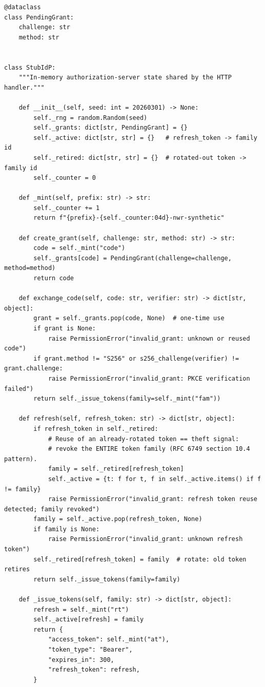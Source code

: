 \begin{verbatim}
@dataclass
class PendingGrant:
    challenge: str
    method: str


class StubIdP:
    """In-memory authorization-server state shared by the HTTP handler."""

    def __init__(self, seed: int = 20260301) -> None:
        self._rng = random.Random(seed)
        self._grants: dict[str, PendingGrant] = {}
        self._active: dict[str, str] = {}   # refresh_token -> family id
        self._retired: dict[str, str] = {}  # rotated-out token -> family id
        self._counter = 0

    def _mint(self, prefix: str) -> str:
        self._counter += 1
        return f"{prefix}-{self._counter:04d}-nwr-synthetic"

    def create_grant(self, challenge: str, method: str) -> str:
        code = self._mint("code")
        self._grants[code] = PendingGrant(challenge=challenge, method=method)
        return code

    def exchange_code(self, code: str, verifier: str) -> dict[str, object]:
        grant = self._grants.pop(code, None)  # one-time use
        if grant is None:
            raise PermissionError("invalid_grant: unknown or reused code")
        if grant.method != "S256" or s256_challenge(verifier) != grant.challenge:
            raise PermissionError("invalid_grant: PKCE verification failed")
        return self._issue_tokens(family=self._mint("fam"))

    def refresh(self, refresh_token: str) -> dict[str, object]:
        if refresh_token in self._retired:
            # Reuse of an already-rotated token == theft signal:
            # revoke the ENTIRE token family (RFC 6749 section 10.4 pattern).
            family = self._retired[refresh_token]
            self._active = {t: f for t, f in self._active.items() if f != family}
            raise PermissionError("invalid_grant: refresh token reuse detected; family revoked")
        family = self._active.pop(refresh_token, None)
        if family is None:
            raise PermissionError("invalid_grant: unknown refresh token")
        self._retired[refresh_token] = family  # rotate: old token retires
        return self._issue_tokens(family=family)

    def _issue_tokens(self, family: str) -> dict[str, object]:
        refresh = self._mint("rt")
        self._active[refresh] = family
        return {
            "access_token": self._mint("at"),
            "token_type": "Bearer",
            "expires_in": 300,
            "refresh_token": refresh,
        }



\end{verbatim}
